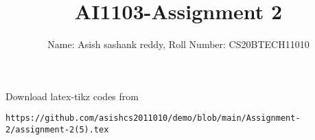\documentclass[journal,12pt,twocolumn]{IEEEtran}
\DeclareMathOperator*{\Res}{Res}
\begin{document}
\newcommand{\BEQA}{\begin{eqnarray}}
\newcommand{\EEQA}{\end{eqnarray}}
\newcommand{\define}{\stackrel{\triangle}{=}}

\raggedbottom
\setlength{\parindent}{0pt}
\providecommand{\mbf}{\mathbf}
\providecommand{\pr}[1]{\ensuremath{\Pr\left(#1\right)}}
\providecommand{\qfunc}[1]{\ensuremath{Q\left(#1\right)}}
\providecommand{\sbrak}[1]{\ensuremath{{}\left[#1\right]}}
\providecommand{\lsbrak}[1]{\ensuremath{{}\left[#1\right.}}
\providecommand{\rsbrak}[1]{\ensuremath{{}\left.#1\right]}}
\providecommand{\brak}[1]{\ensuremath{\left(#1\right)}}
\providecommand{\lbrak}[1]{\ensuremath{\left(#1\right.}}
\providecommand{\rbrak}[1]{\ensuremath{\left.#1\right)}}
\providecommand{\cbrak}[1]{\ensuremath{\left\{#1\right\}}}
\providecommand{\lcbrak}[1]{\ensuremath{\left\{#1\right.}}
\providecommand{\rcbrak}[1]{\ensuremath{\left.#1\right\}}}
\theoremstyle{remark}
\newtheorem{rem}{Remark}
\newcommand{\sgn}{\mathop{\mathrm{sgn}}}
\providecommand{\abs}[1]{\vert#1\vert}
\providecommand{\res}[1]{\Res\displaylimits_{#1}} 
\providecommand{\norm}[1]{\lVert#1\rVert}
\providecommand{\mtx}[1]{\mathbf{#1}}
\providecommand{\mean}[1]{E[ #1 ]}
\providecommand{\fourier}{\overset{\mathcal{F}}{ \rightleftharpoons}}
\providecommand{\system}{\overset{\mathcal{H}}{ \longleftrightarrow}}
\newcommand{\solution}{\noindent \textbf{Solution: }}
\newcommand{\cosec}{\,\text{cosec}\,}
\providecommand{\dec}[2]{\ensuremath{\overset{#1}{\underset{#2}{\gtrless}}}}
\newcommand{\myvec}[1]{\ensuremath{\begin{pmatrix}#1\end{pmatrix}}}
\newcommand{\mydet}[1]{\ensuremath{\begin{vmatrix}#1\end{vmatrix}}}
\makeatletter
{}
\makeatother
\let\StandardTheFigure\thefigure
\let\vec\mathbf
\renewcommand{\thefigure}{\theproblem}
\def\putbox#1#2#3{\makebox[0in][l]{\makebox[#1][l]{}\raisebox{\baselineskip}[0in][0in]{\raisebox{#2}[0in][0in]{#3}}}}
     \def\rightbox#1{\makebox[0in][r]{#1}}
     \def\centbox#1{\makebox[0in]{#1}}
     \def\topbox#1{\raisebox{-\baselineskip}[0in][0in]{#1}}
     \def\midbox#1{\raisebox{-0.5\baselineskip}[0in][0in]{#1}}
\vspace{3cm}
\title{AI1103-Assignment 2}
\author{Name: Asish sashank reddy, Roll Number: CS20BTECH11010}
\maketitle
\newpage
\bigskip
\renewcommand{\thefigure}{\theenumi}
\renewcommand{\thetable}{\theenumi}
Download latex-tikz codes from 
%
\begin{lstlisting}
https://github.com/asishcs2011010/demo/blob/main/Assignment-2/assignment-2(5).tex
\end{lstlisting}
\end{document}
